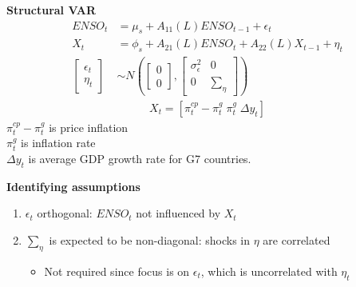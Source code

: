 \documentclass{beamer}
\begin{document}
\begin{frame}
 \textbf{Structural VAR}\\
   \begin{align}
    ENSO_t &= \mu_s +A_{11}(L)ENSO_{t-1} + \epsilon_t\\ \nonumber
    X_t &= \phi_s + A_{21}(L)ENSO_t + A_{22}(L)X_{t-1} + \eta_t\\
    \begin{bmatrix}      \epsilon_t \\ \eta_t    \end{bmatrix}
    &\sim N \left ( \begin{bmatrix} 0 \\ 0 \end{bmatrix},
    \begin{bmatrix} \sigma^2_{\epsilon} & 0 \\ 0 & \sum_{\eta} \end{bmatrix}
     \right)
  \end{align}
  \begin{align}
    X_t=[\pi^{cp}_t-\pi^g_t\; \pi^g_t \;\Delta y_t]
  \end{align}
  $\pi^{cp}_t-\pi^g_t$ is price inflation\\
  $\pi^g_t$ is inflation rate\\
  $\Delta y_t$ is average GDP growth rate for G7 countries.

\end{frame}

\begin{frame}
  \textbf{Identifying assumptions}
  \begin{enumerate}
    \item $\epsilon_t$ orthogonal: $ENSO_t$ not influenced by $X_t$ 
    \medskip
    \item $\sum_{\eta}$ is expected to be non-diagonal: shocks in $\eta$ are correlated
    \begin{itemize}
      \item Not required since focus is on $\epsilon_t$, which is uncorrelated with $\eta_t$
    \end{itemize}
  \end{enumerate}
\end{frame}
\end{document}
